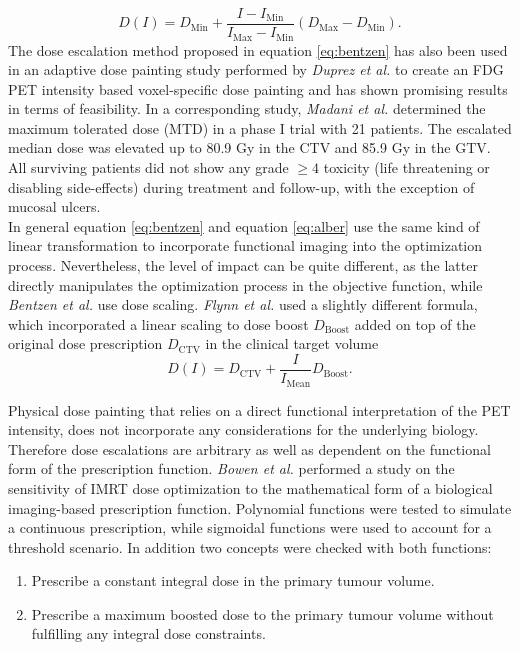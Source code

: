 \begin{itemize}
\begin{equation}\label{eq:bentzen}
D(I) = D_{\mathrm{Min}} + \frac{I-I_{\mathrm{Min}}}{I_{\mathrm{Max}}-I_{\mathrm{Min}}}\left(D_{\mathrm{Max}}-D_{\mathrm{Min}}\right).
\end{equation}
The dose escalation method proposed in equation \ref{eq:bentzen} has also been used in an adaptive dose painting study performed by \textit{Duprez et al.} \cite{pmid20643512} to create an FDG PET intensity based voxel-specific dose painting and has shown promising results in terms of feasibility. In a corresponding study, \textit{Madani et al.} \cite{pmid21742392} determined the maximum tolerated dose (MTD) in a phase I trial with 21 patients. The escalated median dose was elevated up to 80.9 Gy in the CTV and 85.9 Gy in the GTV. All surviving patients did not show any grade $\geq 4$ toxicity (life threatening or disabling side-effects) during treatment and follow-up, with the exception of mucosal ulcers. \\In general equation \ref{eq:bentzen} and equation \ref{eq:alber} use the same kind of linear transformation to incorporate functional imaging into the optimization process. Nevertheless, the level of impact can be quite different, as the latter directly manipulates the optimization process in the objective function, while \textit{Bentzen et al.} use dose scaling. \textit{Flynn et al.} \cite{pmid18635895} used a slightly different formula, which incorporated a linear scaling to dose boost $D_{\mathrm{Boost}}$ added on top of the original dose prescription $D_\mathrm{CTV}$ in the clinical target volume
\begin{equation}
D(I) = D_\mathrm{CTV} + \frac{I}{I_\mathrm{Mean}}D_\mathrm{Boost}.
\end{equation}
\end{itemize}
Physical dose painting that relies on a direct functional interpretation of the PET intensity, does not incorporate any considerations for the underlying biology. Therefore dose escalations are arbitrary as well as dependent on the functional form of the prescription function. \textit{Bowen et al.} \cite{pmid19218733} performed a study on the sensitivity of IMRT dose optimization to the mathematical form of a biological imaging-based prescription function. Polynomial functions were tested to simulate a continuous prescription, while sigmoidal functions were used to account for a threshold scenario. In addition two concepts were checked with both functions:
\begin{enumerate}
\item Prescribe a constant integral dose in the primary tumour volume.
\item Prescribe a maximum boosted dose to the primary tumour volume without fulfilling any integral dose constraints.
\end{enumerate}
